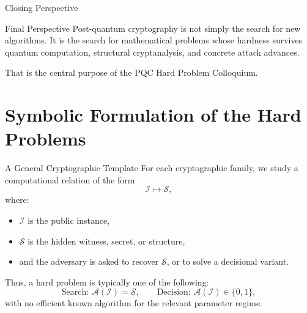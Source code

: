 \documentclass[aspectratio=169]{beamer}
\begin{document}
	\begin{frame}{Closing Perspective}
		\begin{block}{Final Perspective}
			Post-quantum cryptography is not simply the search for new algorithms. It is the search for mathematical problems whose hardness survives quantum computation, structural cryptanalysis, and concrete attack advances.
		\end{block}
		
		\vspace{0.75em}
		That is the central purpose of the PQC Hard Problem Colloquium.
	\end{frame}

	\section{Symbolic Formulation of the Hard Problems}
	
	\begin{frame}{A General Cryptographic Template}
		For each cryptographic family, we study a computational relation of the form
		\[
		\mathcal{I} \mapsto \mathcal{S},
		\]
		where:
		\begin{itemize}
			\item $\mathcal{I}$ is the public instance,
			\item $\mathcal{S}$ is the hidden witness, secret, or structure,
			\item and the adversary is asked to recover $\mathcal{S}$, or to solve a decisional variant.
		\end{itemize}
		
		\vspace{0.5em}
		Thus, a hard problem is typically one of the following:
		\[
		\text{Search: } \mathcal{A}(\mathcal{I}) = \mathcal{S},
		\qquad
		\text{Decision: } \mathcal{A}(\mathcal{I}) \in \{0,1\},
		\]
		with no efficient known algorithm for the relevant parameter regime.
	\end{frame}
	
	
\end{document}
